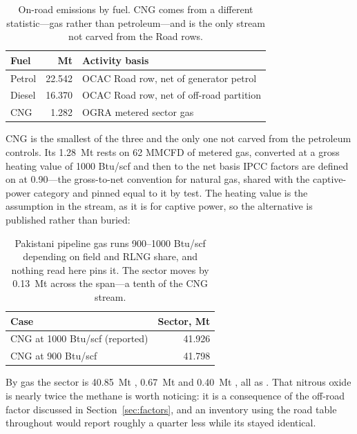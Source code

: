 \begin{table}[htbp]
\centering
\footnotesize
\begin{tabular}{@{}lrl@{}}
\toprule
\textbf{Fuel} & \textbf{Mt \COe{}} & \textbf{Activity basis} \\
\midrule
Petrol                    & 22.542 & OCAC Road row, net of generator petrol \\
Diesel                    & 16.370 & OCAC Road row, net of off-road partition \\
CNG                       &  1.282 & OGRA metered sector gas \\
\bottomrule
\end{tabular}
\caption{On-road emissions by fuel. CNG comes from a different statistic---gas rather
than petroleum---and is the only stream not carved from the Road rows.}
\label{tab:fuels}
\end{table}

CNG is the smallest of the three and the only one not carved from the petroleum controls.
Its \SI{1.28}{\mega\tonne} rests on \SI{62}{} MMCFD of metered gas, converted at a gross
heating value of \SI{1000}{} Btu/scf and then to the net basis IPCC factors are defined on
at \num{0.90}---the gross-to-net convention for natural gas, shared with the captive-power
category and pinned equal to it by test. The heating value is the assumption in the stream,
as it is for captive power, so the alternative is published rather than buried:

\begin{table}[htbp]
\centering
\footnotesize
\begin{tabular}{@{}lr@{}}
\toprule
\textbf{Case} & \textbf{Sector, Mt \COe{}} \\
\midrule
CNG at \SI{1000}{} Btu/scf (reported) & 41.926 \\
CNG at \SI{900}{} Btu/scf     & 41.798 \\
\bottomrule
\end{tabular}
\caption{Pakistani pipeline gas runs \SIrange{900}{1000}{} Btu/scf depending on field and RLNG
share, and nothing read here pins it. The sector moves by \SI{0.13}{\mega\tonne} across the
span---a tenth of the CNG stream.}
\label{tab:cnghhv}
\end{table}

By gas the sector is \SI{40.85}{\mega\tonne} \COtwo{}, \SI{0.67}{\mega\tonne} \NtwoO{} and
\SI{0.40}{\mega\tonne} \CHfour{}, all as \COe{}. That nitrous oxide is nearly twice the methane is
worth noticing: it is a consequence of the off-road factor discussed in
Section~\ref{sec:factors}, and an inventory using the road table throughout would report
roughly a quarter less \NtwoO{} while its \COtwo{} stayed identical.

